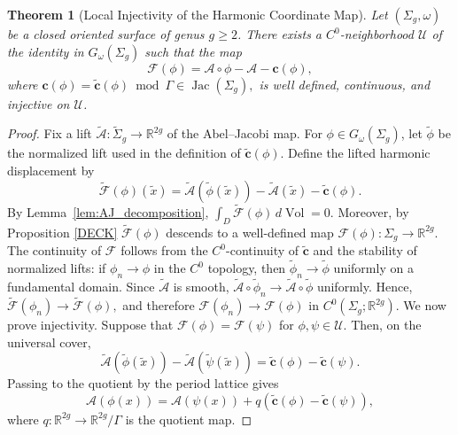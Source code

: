 \documentclass[11pt]{article}
\newtheorem{theorem}{Theorem}[section]
\theoremstyle{definition}
\newcommand{\Jac}{\operatorname{Jac}}
\begin{document}
	\begin{theorem}[Local Injectivity of the Harmonic Coordinate Map]
		\label{thm:flux_coordinate_map}
		Let $(\Sigma_g,\omega)$ be a closed oriented surface of genus $g\ge2$. There
		exists a $C^0$-neighborhood $\mathcal U$ of the identity in $G_\omega(\Sigma_g)$
		such that the map
		\[
		\mathcal F(\phi) = \mathcal A\circ\phi-\mathcal A-\mathbf c(\phi),
		\]
		where $\mathbf c(\phi) = \widetilde{\mathbf c}(\phi)\bmod\Gamma \in\Jac(\Sigma_g),$
		is well defined, continuous, and injective on $\mathcal U$.
	\end{theorem}
	
	\begin{proof}
		Fix a lift $\widetilde{\mathcal A}:\widetilde{\Sigma}_g\longrightarrow \mathbb
		R^{2g}$ of the Abel--Jacobi map. For $\phi\in G_\omega(\Sigma_g)$, let
		$\widetilde\phi$ be the normalized lift used in the definition of $\widetilde{\mathbf
			c}(\phi)$. Define the lifted harmonic displacement by
		\[
		\widetilde{\mathcal F}(\phi)(\tilde x) = \widetilde{\mathcal
			A}(\widetilde\phi(\tilde x)) - \widetilde{\mathcal A}(\tilde x) -
		\widetilde{\mathbf c}(\phi).
		\]
		By Lemma~\ref{lem:AJ_decomposition}, $\int_D\widetilde{\mathcal
			F}(\phi)\,d\operatorname{Vol}=0.$ Moreover, by Proposition \ref{DECK}
		$\widetilde{\mathcal F}(\phi)$ descends to a well-defined map $\mathcal
		F(\phi):\Sigma_g\longrightarrow\mathbb R^{2g}.$ The continuity of $\mathcal F$
		follows from the $C^0$-continuity of $\widetilde{\mathbf c}$ and the stability
		of normalized lifts: if $\phi_n\longrightarrow\phi$ in the $C^0$ topology, then
		$\widetilde\phi_n\longrightarrow\widetilde\phi$ uniformly on a fundamental
		domain. Since $\widetilde{\mathcal A}$ is smooth, $\widetilde{\mathcal
			A}\circ\widetilde\phi_n \longrightarrow \widetilde{\mathcal A}\circ\widetilde\phi$
		uniformly. Hence, $\widetilde{\mathcal F}(\phi_n) \longrightarrow
		\widetilde{\mathcal F}(\phi),$ and therefore $\mathcal F(\phi_n)\longrightarrow
		\mathcal F(\phi)$ in $C^0(\Sigma_g;\mathbb R^{2g})$.	We now prove injectivity. Suppose that $\mathcal F(\phi)=\mathcal F(\psi)$ for
		$\phi,\psi\in\mathcal U$. Then, on the universal cover,
		\[
		\widetilde{\mathcal A}(\widetilde\phi(\tilde x)) -
		\widetilde{\mathcal A}(\widetilde\psi(\tilde x)) = \widetilde{\mathbf c}(\phi)
		- \widetilde{\mathbf c}(\psi).
		\]
		Passing to the quotient by the period lattice gives
		\[
		\mathcal A(\phi(x)) = \mathcal A(\psi(x)) + q(\widetilde{\mathbf c}(\phi) -
		\widetilde{\mathbf c}(\psi)),
		\]
		where $q:\mathbb R^{2g}\rightarrow\mathbb R^{2g}/\Gamma$ is the quotient map.

\end{proof}
\end{document}
